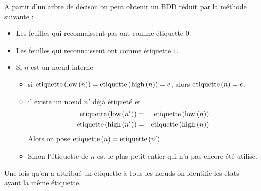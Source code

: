 A partir d'un arbre de décison on peut obtenir un BDD réduit par la méthode suivante :
\begin{itemize}
	\item Les feuilles qui reconnaissent pas ont comme étiquette $0$.
	\item Les feuilles qui reconnaissent ont comme étiquette $1$.
	\item Si $n$ est un nœud interne
	      \begin{itemize}
		      \item si $\text{etiquette}\left(\text{low}\left(n\right)\right) = \text{etiquette}\left(\text{high}\left(n\right)\right) = e$, alors $\text{etiquette}\left(n\right) = e$.
		      \item il existe un nœud $n'$ déjà étiqueté et \tq
		            \begin{eqnarray*}
			            \text{etiquette}\left(\text{low}\left(n'\right)\right) &=& \text{etiquette}\left(\text{low}\left(n\right)\right) \\
			            \text{etiquette}\left(\text{high}\left(n'\right)\right) &=& \text{etiquette}\left(\text{high}\left(n\right)\right)
		            \end{eqnarray*}
		            Alors on pose $\text{etiquette}\left(n\right) = \text{etiquette}\left(n'\right)$
		      \item Sinon l'étiquette de $n$ est le plus petit entier qui n'a pas encore été utilisé.
	      \end{itemize}
\end{itemize}

Une fois qu'on a attribué un étiquette à tous les nœuds on identifie les états ayant la même étiquette.



